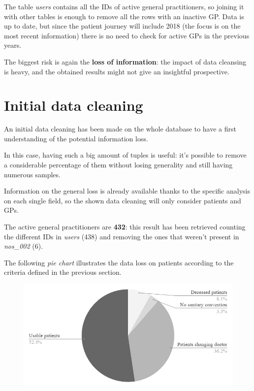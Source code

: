 The table \textit{users} contains all the IDs of active general practitioners, so joining it with other tables is enough to remove all the rows with an inactive GP. Data is up to date, but since the patient journey will include 2018 (the focus is on the most recent information) there is no need to check for active GPs in the previous years.

The biggest risk is again the \textbf{loss of information}: the impact of data cleansing is heavy, and the obtained results might not give an insightful prospective.

\section{Initial data cleaning}
An initial data cleaning has been made on the whole database to have a first understanding of the potential information loss.

In this case, having such a big amount of tuples is useful: it's possible to remove a considerable percentage of them without losing generality and still having numerous samples.

Information on the general loss is already available thanks to the specific analysis on each single field, so the shown data cleaning will only consider patients and GPs.

The active general practitioners are \textbf{432}: this result has been retrieved counting the different IDs in \textit{users} (438) and removing the ones that weren't present in \textit{nos\_002} (6).

The following \textit{pie chart} illustrates the data loss on patients according to the criteria defined in the previous section.
\begin{figure}[h]
	\centering
	\includegraphics[scale=0.6]{images/pie0018.png}
\end{figure}

